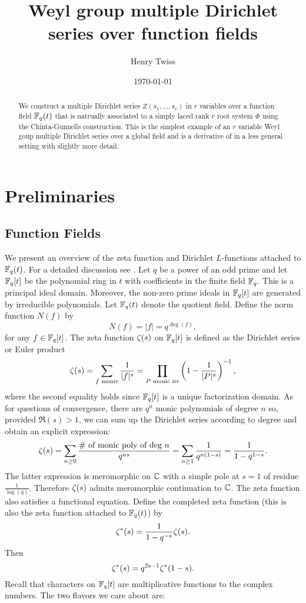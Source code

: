 \documentclass[12pt,reqno,oneside]{amsart}
\title{Weyl group multiple Dirichlet series over function fields}
\author{Henry Twiss}
\date{\today}
\begin{document}
\begin{abstract}
    We construct a multiple Dirichlet series $Z(s_{1},\ldots,s_{r})$ in $r$ variables over a function field $\mathbb{F}_{q}(t)$ that is natrually associated to a simply laced rank $r$ root system $\Phi$ using the Chinta-Gunnells construction. This is the simplest example of an $r$ variable Weyl goup multiple Dirichlet series over a global field and is a derivative of \cite{CG} in a less general setting with slightly more detail. 
\end{abstract}

\maketitle

\section{Preliminaries}
    \subsection*{Function Fields}
        We present an overview of the zeta function and Dirichlet $L$-functions attached to $\mathbb{F}_{q}(t)$. For a detailed discussion see \cite{R}. Let $q$ be a power of an odd prime and let $\mathbb{F}_{q}[t]$ be the polynomial ring in $t$ with coefficients in the finite field $\mathbb{F}_{q}$. This is a principal ideal domain. Moreover, the non-zero prime ideals in $\mathbb{F}_{q}[t]$ are generated by irreducible polynomials. Let $\mathbb{F}_{q}(t)$ denote the quotient field. Define the norm function $N(f)$ by
        \[
            N(f) = |f| = q^{\deg(f)},
        \]
        for any $f \in \mathbb{F}_{q}[t]$. The zeta function $\zeta(s)$ on $\mathbb{F}_{q}[t]$ is defined as the Dirichlet series or Euler product
        \[
            \zeta(s) = \sum_{\text{$f$ monic}}\frac{1}{|f|^{s}} = \prod_{\text{$P$ monic irr}}\left(1-\frac{1}{|P|^{s}}\right)^{-1},
        \]
        where the second equality holds since $\mathbb{F}_{q}[t]$ is a unique factorization domain. As for questions of convergence, there are $q^{n}$ monic polynomials of degree $n$ so, provided $\Re(s) > 1$, we can sum up the Dirichlet series according to degree and obtain an explicit expression:
        \[
            \zeta(s) = \sum_{n \ge 0}\frac{\text{\# of monic poly of deg $n$}}{q^{ns}} = \sum_{n \ge 1}\frac{1}{q^{n(1-s)}} = \frac{1}{1-q^{1-s}}.
        \]
        The latter expression is meromorphic on $\mathbb{C}$ with a simple pole at $s = 1$ of residue $\frac{1}{\log(q)}$. Therefore $\zeta(s)$ admits meromorphic continuation to $\mathbb{C}$. The zeta function also satisfies a functional equation. Define the completed zeta function (this is also the zeta function attached to $\mathbb{F}_{q}(t)$) by
        \[
            \zeta^{\ast}(s) = \frac{1}{1-q^{-s}}\zeta(s).
        \]
        Then
        \[
            \zeta^{\ast}(s) = q^{2s-1}\zeta^{\ast}(1-s).
        \]
        Recall that characters on $\mathbb{F}_{q}[t]$ are multiplicative functions to the complex numbers. The two flavors we care about are:
        
\end{document}
